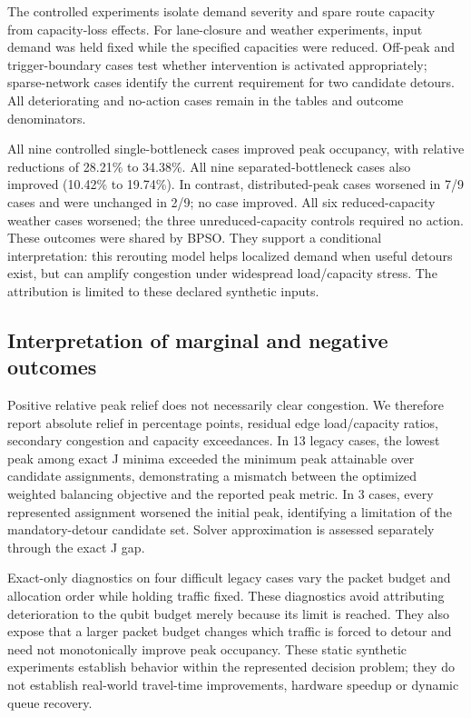 The controlled experiments isolate demand severity and spare route capacity from capacity-loss effects. For lane-closure and weather experiments, input demand was held fixed while the specified capacities were reduced. Off-peak and trigger-boundary cases test whether intervention is activated appropriately; sparse-network cases identify the current requirement for two candidate detours. All deteriorating and no-action cases remain in the tables and outcome denominators.

All nine controlled single-bottleneck cases improved peak occupancy, with relative reductions of 28.21\% to 34.38\%. All nine separated-bottleneck cases also improved (10.42\% to 19.74\%). In contrast, distributed-peak cases worsened in 7/9 cases and were unchanged in 2/9; no case improved. All six reduced-capacity weather cases worsened; the three unreduced-capacity controls required no action. These outcomes were shared by BPSO. They support a conditional interpretation: this rerouting model helps localized demand when useful detours exist, but can amplify congestion under widespread load/capacity stress. The attribution is limited to these declared synthetic inputs.

\subsection{Interpretation of marginal and negative outcomes}

Positive relative peak relief does not necessarily clear congestion. We therefore report absolute relief in percentage points, residual edge load/capacity ratios, secondary congestion and capacity exceedances. In 13 legacy cases, the lowest peak among exact J minima exceeded the minimum peak attainable over candidate assignments, demonstrating a mismatch between the optimized weighted balancing objective and the reported peak metric. In 3 cases, every represented assignment worsened the initial peak, identifying a limitation of the mandatory-detour candidate set. Solver approximation is assessed separately through the exact J gap.

Exact-only diagnostics on four difficult legacy cases vary the packet budget and allocation order while holding traffic fixed. These diagnostics avoid attributing deterioration to the qubit budget merely because its limit is reached. They also expose that a larger packet budget changes which traffic is forced to detour and need not monotonically improve peak occupancy. These static synthetic experiments establish behavior within the represented decision problem; they do not establish real-world travel-time improvements, hardware speedup or dynamic queue recovery.
